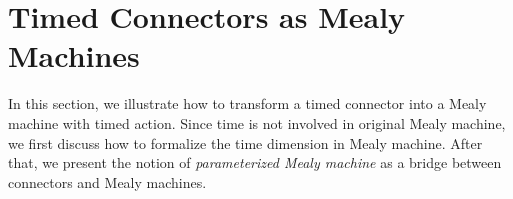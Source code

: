 \documentclass[conference, a4paper]{IEEEtran}
\begin{document}
\section{Timed Connectors as Mealy Machines}
\label{sec:semantics}

In this section, we illustrate how to transform a timed connector into a Mealy machine with timed
action.
Since time is not involved in original Mealy machine, we first discuss how to formalize the time
dimension in Mealy machine. After that, we present the notion of \emph{parameterized Mealy
machine} as a bridge between connectors and Mealy machines.




\end{document}

